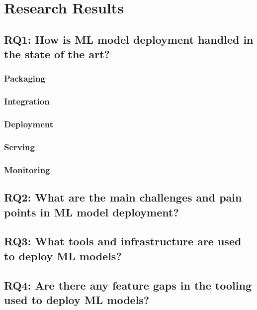 \chapter{Research Results}
\section{RQ1: How is ML model deployment handled in the state of the art?}
\subsection{Packaging}

\subsection{Integration}
\subsection{Deployment}
\subsection{Serving}
\subsection{Monitoring}
\section{RQ2: What are the main challenges and pain points in ML model deployment?}
\section{RQ3: What tools and infrastructure are used to deploy ML models?}
\section{RQ4: Are there any feature gaps in the tooling used to deploy ML models?}